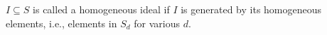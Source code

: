 $I \subseteq S$ is called a homogeneous ideal if $I$ is generated by its
homogeneous elements, i.e., elements in $S_d$ for various $d$.
